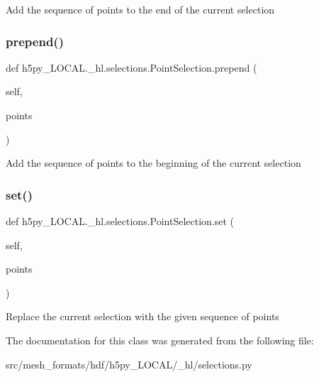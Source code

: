 \begin{DoxyVerb}Add the sequence of points to the end of the current selection \end{DoxyVerb}
 \mbox{\label{classh5py__LOCAL_1_1__hl_1_1selections_1_1PointSelection_a0c206ef785950061e213bf8c51bb8be4}} 
\subsubsection{\texorpdfstring{prepend()}{prepend()}}
{\footnotesize\ttfamily def h5py\+\_\+\+L\+O\+C\+A\+L.\+\_\+hl.\+selections.\+Point\+Selection.\+prepend (\begin{DoxyParamCaption}\item[{}]{self,  }\item[{}]{points }\end{DoxyParamCaption})}

\begin{DoxyVerb}Add the sequence of points to the beginning of the current selection \end{DoxyVerb}
 \mbox{\label{classh5py__LOCAL_1_1__hl_1_1selections_1_1PointSelection_ab13263364c3ace60d2eb6a6262dfc026}} 
\subsubsection{\texorpdfstring{set()}{set()}}
{\footnotesize\ttfamily def h5py\+\_\+\+L\+O\+C\+A\+L.\+\_\+hl.\+selections.\+Point\+Selection.\+set (\begin{DoxyParamCaption}\item[{}]{self,  }\item[{}]{points }\end{DoxyParamCaption})}

\begin{DoxyVerb}Replace the current selection with the given sequence of points\end{DoxyVerb}
 

The documentation for this class was generated from the following file\+:\begin{DoxyCompactItemize}
\item 
src/mesh\+\_\+formats/hdf/h5py\+\_\+\+L\+O\+C\+A\+L/\+\_\+hl/selections.\+py\end{DoxyCompactItemize}
